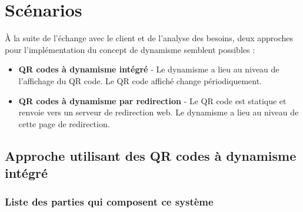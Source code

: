 \documentclass[a4paper,12pt]{article}
\begin{document}
\section{Scénarios}
\label{scenario}

\`A la suite de l'échange avec le client et de l'analyse des besoins, deux approches pour l'implémentation du concept de dynamisme semblent possibles :\\

\begin{itemize}
  \item \textbf{QR codes à dynamisme intégré} - Le dynamisme a lieu au niveau de l’affichage du QR code. Le QR code affiché change périodiquement.\\
  \item \textbf{QR codes à dynamisme par redirection} - Le QR code est statique et renvoie vers un serveur de redirection web. Le dynamisme a lieu au niveau de cette page de redirection.\\
\end{itemize}

\subsection{Approche utilisant des QR codes à dynamisme intégré}

\subsubsection{Liste des parties qui composent ce système}
\end{document}
